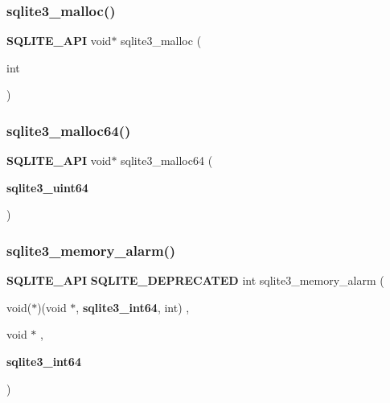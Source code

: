 \mbox{\label{sqlite3_8h_a510e31845345737f17d86ce0b2328356}} 
\subsubsection{sqlite3\_malloc()}
{\footnotesize\ttfamily \textbf{ S\+Q\+L\+I\+T\+E\+\_\+\+A\+PI} void$\ast$ sqlite3\+\_\+malloc (\begin{DoxyParamCaption}\item[{int}]{ }\end{DoxyParamCaption})}

\mbox{\label{sqlite3_8h_a12b7ee85e539ea28c130c5c75b96a82a}} 
\subsubsection{sqlite3\_malloc64()}
{\footnotesize\ttfamily \textbf{ S\+Q\+L\+I\+T\+E\+\_\+\+A\+PI} void$\ast$ sqlite3\+\_\+malloc64 (\begin{DoxyParamCaption}\item[{\textbf{ sqlite3\+\_\+uint64}}]{ }\end{DoxyParamCaption})}

\mbox{\label{sqlite3_8h_ab4c534cd6877aa11ebe3f874365ed7d0}} 
\subsubsection{sqlite3\_memory\_alarm()}
{\footnotesize\ttfamily \textbf{ S\+Q\+L\+I\+T\+E\+\_\+\+A\+PI} \textbf{ S\+Q\+L\+I\+T\+E\+\_\+\+D\+E\+P\+R\+E\+C\+A\+T\+ED} int sqlite3\+\_\+memory\+\_\+alarm (\begin{DoxyParamCaption}\item[{void($\ast$)(void $\ast$, \textbf{ sqlite3\+\_\+int64}, int)}]{,  }\item[{void $\ast$}]{,  }\item[{\textbf{ sqlite3\+\_\+int64}}]{ }\end{DoxyParamCaption})}

\mbox{\label{sqlite3_8h_a50dc92faaad5a39762ede980fa3ad933}} 
